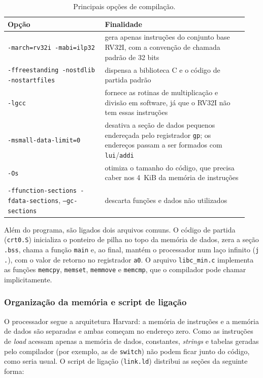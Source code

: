 \begin{table}[htbp]
  \centering
  \caption{Principais opções de compilação.}
  \label{tab:flags-gcc}
  \begin{tabular}{@{}p{0.38\linewidth}p{0.56\linewidth}@{}}
    \toprule
    Opção & Finalidade \\
    \midrule
    \texttt{-march=rv32i -mabi=ilp32} & gera apenas instruções do conjunto
      base RV32I, com a convenção de chamada padrão de 32 bits \\
    \texttt{-ffreestanding -nostdlib -nostartfiles} & dispensa a biblioteca
      C e o código de partida padrão \\
    \texttt{-lgcc} & fornece as rotinas de multiplicação e divisão em
      software, já que o RV32I não tem essas instruções \\
    \texttt{-msmall-data-limit=0} & desativa a seção de dados pequenos
      endereçada pelo registrador \texttt{gp}; os endereços passam a ser
      formados com \texttt{lui}/\texttt{addi} \\
    \texttt{-Os} & otimiza o tamanho do código, que precisa caber nos
      4~KiB da memória de instruções \\
    \texttt{-ffunction-sections -fdata-sections}, \texttt{--gc-sections} &
      descarta funções e dados não utilizados \\
    \bottomrule
  \end{tabular}
\end{table}

Além do programa, são ligados dois arquivos comuns. O código de partida
(\texttt{crt0.S}) inicializa o ponteiro de pilha no topo da memória de
dados, zera a seção \texttt{.bss}, chama a função \texttt{main} e, ao final,
mantém o processador num laço infinito (\texttt{j .}), com o valor de
retorno no registrador \texttt{a0}. O arquivo \texttt{libc\_min.c} implementa
as funções \texttt{memcpy}, \texttt{memset}, \texttt{memmove} e
\texttt{memcmp}, que o compilador pode chamar implicitamente.

\subsubsection{Organização da memória e script de ligação}

O processador segue a arquitetura Harvard: a memória de instruções e a
memória de dados são separadas e ambas começam no endereço zero. Como as
instruções de \textit{load} acessam apenas a memória de dados, constantes,
\textit{strings} e tabelas geradas pelo compilador (por exemplo, as de
\texttt{switch}) não podem ficar junto do código, como seria usual. O script
de ligação (\texttt{link.ld}) distribui as seções da seguinte forma:

